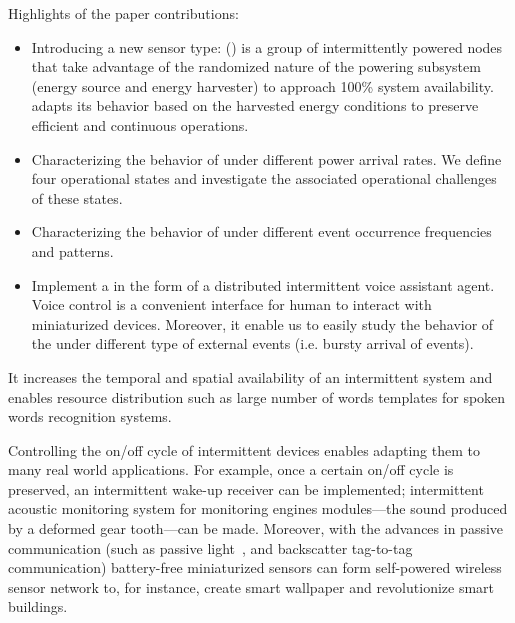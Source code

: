 Highlights of the paper contributions:
\begin{itemize}
		\item Introducing a new sensor type: \textit{\fullsys} (\sys) is a group of intermittently powered nodes that take advantage of the randomized nature of the powering subsystem (energy source and energy harvester) to approach 100\% system availability. \sys adapts its behavior based on the harvested energy conditions to preserve efficient and continuous operations. 
		\item Characterizing the behavior of \fullsys under different power arrival rates. We define four \sys operational states and investigate the associated operational challenges of these states. 
		\item Characterizing the behavior of \fullsys under different event occurrence frequencies and patterns. 
		\item Implement a \fullsys in the form of a distributed intermittent voice assistant agent. Voice control is a convenient interface for human to interact with miniaturized devices. Moreover, it enable us to easily study the behavior of the \sys under different type of external events (i.e. bursty arrival of events).
\end{itemize}





%
 It increases the temporal and spatial availability of an intermittent system and enables resource distribution such as large number of words templates for spoken words recognition systems. 

Controlling the on/off cycle of intermittent devices enables adapting them to many real world applications. For example, once a certain on/off cycle is preserved, an intermittent wake-up receiver can be implemented; intermittent acoustic monitoring system for monitoring engines modules---the sound produced by a deformed gear tooth---can be made. Moreover, with the advances in passive communication (such as passive light~\cite{}, and backscatter tag-to-tag~\cite{} communication) battery-free miniaturized sensors can form self-powered wireless sensor network to, for instance, create smart wallpaper and revolutionize smart buildings. 


